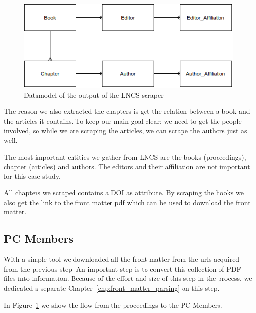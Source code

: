 \documentclass{ou-report}
\begin{document}
\begin{figure}[H]
    \centering
    \includegraphics[width=12cm]{images/lncs_scraper_datamodel.drawio.png}
    \caption{Datamodel of the output of the LNCS scraper}
    \label{fig:lncs_scraper_datamodel}
\end{figure}

The reason we also extracted the chapters is get the relation between a book and
the articles it contains. To keep our main goal clear: we need to get the people
involved, so while we are scraping the articles, we can scrape the authors just 
as well.

The most important entities we gather from LNCS are the books (proceedings), 
chapter (articles) and authors. The editors and their affiliation are not 
important for this case study. 

All chapters we scraped contains a DOI as attribute. 
By scraping the books we also get the link to the front matter pdf which can be 
used to download the front matter.

\subsection{PC Members}
With a simple tool we downloaded all the front matter from the urls acquired 
from the previous step. An important step is to convert this collection of PDF 
files into information. Because of the effort and size of this step in the 
process, we dedicated a separate Chapter~\ref{chp:front_matter_parsing} on this 
step.

In Figure~\ref{fig:lncs_scraper_datamodel} we show the flow from the proceedings
to the PC Members.
\end{document}
